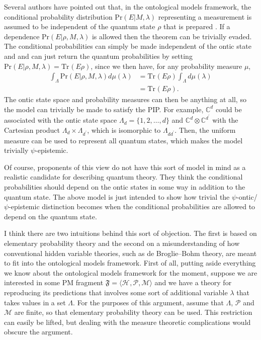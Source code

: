 \documentclass[DIV=calc,fontsize=12pt]{scrartcl} %
\theoremstyle{definition}
\theoremstyle{plain}
\newcommand{\Hilb}[1][]{\ensuremath{\mathcal{H}_{#1}}}
\newcommand{\Tr}[2][]{\ensuremath{\text{Tr}_{#1} \left ( #2 \right )}}
\begin{document}
\label{Crit:Response}

Several authors have pointed out that, in the ontological models
framework, the conditional probability distribution
$\text{Pr}(E|M,\lambda)$ representing a measurement is assumed to be
independent of the quantum state $\rho$ that is prepared
\cite{Drezet2012, Drezet2012a, Schlosshauer2012}.  If a dependence
$\text{Pr}(E|\rho,M,\lambda)$ is allowed then the theorem can be
trivially evaded.  The conditional probabilities can simply be made
independent of the ontic state and and can just return the quantum
probabilities by setting $\text{Pr}(E|\rho,M,\lambda) = \Tr{E \rho}$,
since we then have, for any probability measure $\mu$,
\begin{align}
\int_{\Lambda} \text{Pr}(E|\rho,M,\lambda) d\mu(\lambda) & =
\Tr{E\rho} \int_{\Lambda} d\mu(\lambda) \\
& = \Tr{E\rho}.
\end{align}
The ontic state space and probability measures can then be anything at
all, so the model can trivially be made to satisfy the PIP\@.  For
example, $\mathbb{C}^d$ could be associated with the ontic state space
$\Lambda_d = \{1,2,\ldots,d\}$ and $\mathbb{C}^d \otimes
\mathbb{C}^{d^{\prime}}$ with the Cartesian product $\Lambda_d \times
\Lambda_{d^{\prime}}$, which is isomorphic to $\Lambda_{dd^{\prime}}$.
Then, the uniform measure can be used to represent all quantum states,
which makes the model trivially $\psi$-epistemic.

Of course, proponents of this view do not have this sort of model in
mind as a realistic candidate for describing quantum theory.  They
think the conditional probabilities should depend on the ontic states
in some way in addition to the quantum state.  The above model is just
intended to show how trivial the $\psi$-ontic/$\psi$-epistemic
distinction becomes when the conditional probabilities are allowed to
depend on the quantum state.

I think there are two intuitions behind this sort of objection.  The
first is based on elementary probability theory and the second on a
misunderstanding of how conventional hidden variable theories, such as
de Broglie--Bohm theory, are meant to fit into the ontological models
framework.  First of all, putting aside everything we know about the
ontological models framework for the moment, suppose we are interested
in some PM fragment $\mathfrak{F} = \langle \Hilb,
\mathcal{P}, \mathcal{M} \rangle$ and we have a theory for reproducing
its predictions that involves some sort of additional variable
$\lambda$ that takes values in a set $\Lambda$.  For the purposes of
this argument, assume that $\Lambda$, $\mathcal{P}$ and $\mathcal{M}$
are finite, so that elementary probability theory can be used.  This
restriction can easily be lifted, but dealing with the measure
theoretic complications would obscure the argument.
\end{document}
